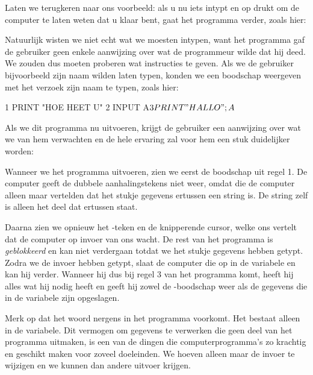 \needspace{4cm}
Laten we terugkeren naar ons voorbeeld: als u nu iets intypt en op  drukt om de computer te laten weten dat u klaar bent, gaat het programma verder, zoals hier:


\needspace{4cm}
Natuurlijk wisten we niet echt wat we moesten intypen, want het programma gaf de gebruiker geen enkele aanwijzing over wat de programmeur wilde dat hij deed. We zouden dus moeten proberen wat instructies te geven. Als we de gebruiker bijvoorbeeld zijn naam wilden laten typen, konden we een boodschap weergeven met het verzoek zijn naam te typen, zoals hier:

\begin{screencode}
  1 PRINT "HOE HEET U"
  2 INPUT A$
  3 PRINT "HALLO "; A$
\end{screencode}

\needspace{4cm}
Als we dit programma nu uitvoeren, krijgt de gebruiker een aanwijzing over wat we van hem verwachten en de hele ervaring zal voor hem een stuk duidelijker worden:


Wanneer we het programma uitvoeren, zien we eerst de boodschap  uit regel 1. De computer geeft de dubbele aanhalingstekens niet weer, omdat die de computer alleen maar vertelden dat het stukje gegevens ertussen een string is. De string zelf is alleen het deel dat ertussen staat.

Daarna zien we opnieuw het -teken en de knipperende cursor, welke ons vertelt dat de computer op invoer van ons wacht. De rest van het programma is {\em geblokkeerd} en kan niet verdergaan totdat we het stukje gegevens hebben getypt. Zodra we de invoer hebben getypt, slaat de computer die op in de variabele  en kan hij verder. Wanneer hij dus bij regel 3 van het programma komt, heeft hij alles wat hij nodig heeft en geeft hij zowel de -boodschap weer als de gegevens die in de variabele  zijn opgeslagen.

Merk op dat het woord  nergens in het programma voorkomt. Het bestaat alleen in de variabele. Dit vermogen om gegevens te verwerken die geen deel van het programma uitmaken, is een van de dingen die computerprogramma's zo krachtig en geschikt maken voor zoveel doeleinden. We hoeven alleen maar de invoer te wijzigen en we kunnen dan andere uitvoer krijgen.


